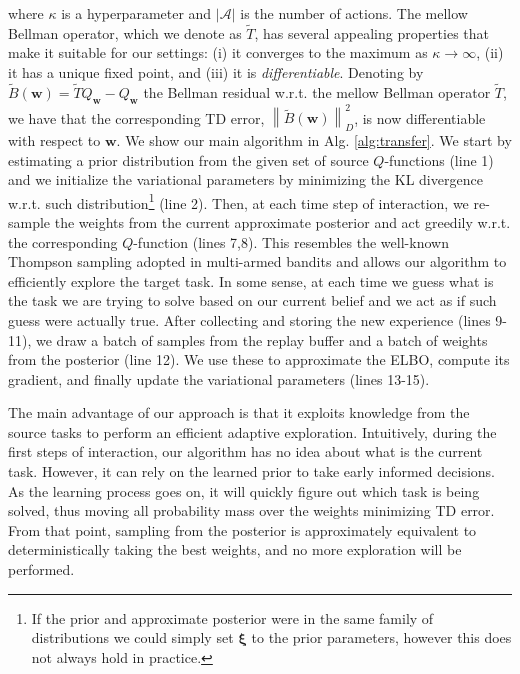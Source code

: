 \documentclass{article}
\newcommand{\wt}[1]{\widetilde{#1}}
\newcommand{\norm}[1]{\left\lVert #1 \right\rVert}
\begin{document}
where $\kappa$ is a hyperparameter and $|\mathcal{A}|$ is the number of actions. The mellow Bellman operator, which we denote as $\wt{T}$, has several appealing properties that make it suitable for our settings: (i) it converges to the maximum as $\kappa \rightarrow \infty$, (ii) it has a unique fixed point, and (iii) it is \textit{differentiable}. Denoting by $\wt{B}(\bm{w}) = \wt{T}Q_{\bm{w}} - Q_{\bm{w}}$ the Bellman residual w.r.t. the mellow Bellman operator $\wt{T}$, we have that the corresponding TD error, $\norm{\wt{B}(\bm{w})}_D^2$, is now differentiable with respect to $\bm{w}$.  We show our main algorithm in Alg. \ref{alg:transfer}. We start by estimating a prior distribution from the given set of source $Q$-functions (line 1) and we initialize the variational parameters by minimizing the KL divergence w.r.t. such distribution\footnote{If the prior and approximate posterior were in the same family of distributions we could simply set $\bm{\xi}$ to the prior parameters, however this does not always hold in practice.} (line 2). Then, at each time step of interaction, we re-sample the weights from the current approximate posterior and act greedily w.r.t. the corresponding $Q$-function (lines 7,8). This resembles the well-known Thompson sampling adopted in multi-armed bandits \cite{} and allows our algorithm to efficiently explore the target task. In some sense, at each time we guess what is the task we are trying to solve based on our current belief and we act as if such guess were actually true. After collecting and storing the new experience (lines 9-11), we draw a batch of samples from the replay buffer and a batch of weights from the posterior (line 12). We use these to approximate the ELBO, compute its gradient, and finally update the variational parameters (lines 13-15). 

The main advantage of our approach is that it exploits knowledge from the source tasks to perform an efficient adaptive exploration. Intuitively, during the first steps of interaction, our algorithm has no idea about what is the current task. However, it can rely on the learned prior to take early informed decisions. As the learning process goes on, it will quickly figure out which task is being solved, thus moving all probability mass over the weights minimizing TD error. From that point, sampling from the posterior is approximately equivalent to deterministically taking the best weights, and no more exploration will be performed.
\end{document}
